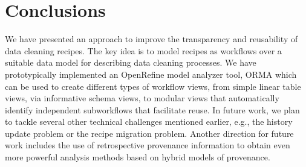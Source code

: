 \documentclass[conference]{ijdc-v14}
\newcommand{\figref}[1]{Fig.\,\ref{#1}}
\newcommand{\orma}{\textsf{ORMA}\xspace}  %
\newcommand{\openrefine}{\textrm{OpenRefine}\xspace}
\begin{document}
 
 

\section{Conclusions}
%

We have presented an approach to improve the transparency and reusability of data cleaning
recipes. The key idea is to model recipes as workflows over a suitable data model for describing
data cleaning processes. We have prototypically implemented an \openrefine model analyzer tool,
\orma \cite{orma2021} which can be used to create different types of workflow views, from simple
linear table views, via informative schema views, to modular views that automatically identify
independent subworkflows that facilitate reuse. In future work, we plan to tackle several other
technical challenges mentioned earlier, e.g., the history update problem or the recipe migration
problem. Another direction for future work includes the use of retrospective provenance information
to obtain even more powerful analysis methods based on hybrid models of provenance. 

\end{document}
